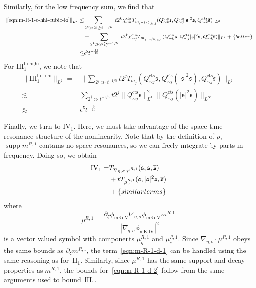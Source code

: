 \documentclass[letterpaper, reqno,final]{amsart}
\DeclareMathOperator{\supp}{supp}
\newcommand{\fs}{\mathfrak{s}}
\newcommand{\rmII}{\mathrm{II}}
\newcommand{\rmIII}{\mathrm{III}}
\newcommand{\rmIV}{\mathrm{IV}}
\newcommand{\tmkdv}{\text{mKdV}}
\newcommand{\phimKdV}{\phi_{\tmkdv}}
\newcommand{\tcts}{\text{cts}}
\newcommand{\fProjc}[1]{{Q^{\tcts}_{#1}}}
\newcommand{\nablaes}{\nabla_{\eta,\sigma}}
\newcommand{\btext}[1]{\left\{\textup{#1}\right\}}
\newcommand{\bbetter}{\btext{better}}
\newcommand{\bsim}{\btext{similar terms}}
\begin{document}
Similarly, for the low frequency sum, we find that
\begin{equation*}\begin{split}
    \lVert \eqref{eqn:m-R-1-c-hhl-cubic-lo} \rVert_{L^2} \leq& \sum_{2^k \gg 2^j \gtrsim t^{-1/5}} \lVert t2^k \chi_{\sim k}^\tcts T_{m_{t^{-1/5},k,j}}(\fProjc{\sim k}\fs, \fProjc{\sim j}|\fs|^2\fs, \fProjc{\sim k}\overline{\fs}) \rVert_{L^2}\\
    &+ \sum_{2^k \gg 2^j \gtrsim t^{-1/5}} \lVert t2^k \chi_{\sim j}^\tcts T_{m_{t^{-1/5},k,j}}(\fProjc{\sim k}\fs, \fProjc{\sim j}|\fs|^2\fs, \fProjc{\sim k}\overline{\fs}) \rVert_{L^2}+ \bbetter\\
    \lesssim& \epsilon^5 t^{-\frac{11}{10}}
\end{split}
\end{equation*}
For $\rmIII_1^\text{hi,hi,hi}$, we note that
\begin{equation*}\begin{split}
    \lVert \rmIII_1^\text{hi,hi,hi} \rVert_{L^2} =& \biggl\lVert\sum_{2^j \gg t^{-1/5}} t 2^j T_{m_j}(Q_{\sim j}^\tcts \fs, Q_{\sim j}^\tcts (|\fs|^2 \fs), \overline{Q_{\sim j}^\tcts \fs}) \biggr \rVert_{L^2}\\
    \lesssim& \sum_{2^j \gg t^{-1/5}} t 2^j \lVert Q_{\sim j}^\tcts \fs \rVert_{L^4}^2 \lVert Q^\tcts_{\sim j} (|\fs|^2\fs) \rVert_{L^\infty}\\
    \lesssim& \epsilon^5 t^{-\frac{9}{10}}
\end{split}\end{equation*}

Finally, we turn to $\rmIV_1$.  Here, we must take advantage of the space-time resonance structure of the nonlinearity. Note that by the definition of $\rho$, $\supp m^{R,1}$ contains no space resonances, so we can freely integrate by parts in frequency.  Doing so, we obtain
\begin{subequations}\begin{align}
    \rmIV_1 =& T_{\nablaes \cdot \mu^{R,1}}(\fs,\fs,\overline{\fs}) \label{eqn:m-R-1-d-1}\\
    &+ tT_{\mu^{R,1}_\eta}(\fs,|\fs|^2\fs,\overline{\fs}) \label{eqn:m-R-1-d-2}\\
    &+\bsim\notag
\end{align}\end{subequations}
where 
\begin{equation*}
    \mu^{R,1} = \frac{\partial_\xi \phimKdV \nablaes \phimKdV m^{R,1}}{|\nablaes \phimKdV|^2}
\end{equation*}
is a vector valued symbol with components $\mu^{R,1}_\eta$ and $\mu^{R,1}_\sigma$. Since $\nablaes \cdot \mu^{R,1}$ obeys the same bounds as $\partial_\xi m^{R,1}$, the term~\eqref{eqn:m-R-1-d-1} can be handled using the same reasoning as for~$\rmII_1$.  Similarly, since $\mu^{R,1}$ has the same support and decay properties as $m^{R,1}$, the bounds for~\eqref{eqn:m-R-1-d-2} follow from the same arguments used to bound~$\rmIII_1$.
\end{document}
